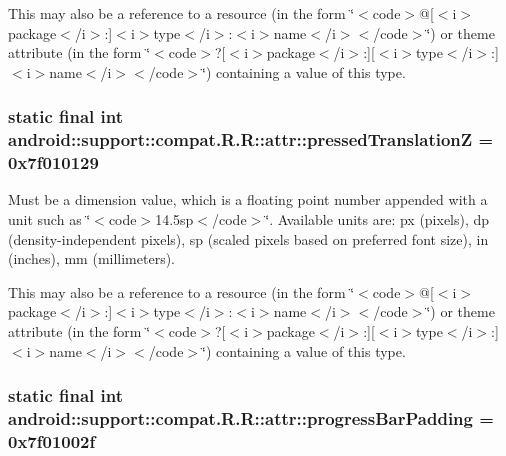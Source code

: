 This may also be a reference to a resource (in the form \char`\"{}$<$code$>$@\mbox{[}$<$i$>$package$<$/i$>$:\mbox{]}$<$i$>$type$<$/i$>$:$<$i$>$name$<$/i$>$$<$/code$>$\char`\"{}) or theme attribute (in the form \char`\"{}$<$code$>$?\mbox{[}$<$i$>$package$<$/i$>$:\mbox{]}\mbox{[}$<$i$>$type$<$/i$>$:\mbox{]}$<$i$>$name$<$/i$>$$<$/code$>$\char`\"{}) containing a value of this type. \hypertarget{classandroid_1_1support_1_1compat_1_1_r_1_1attr_0517f3b070d004ba4bca93d45eeea1df}{
\subsubsection[{pressedTranslationZ}]{\setlength{\rightskip}{0pt plus 5cm}static final int android::support::compat.R.R::attr::pressedTranslationZ = 0x7f010129}}
\label{classandroid_1_1support_1_1compat_1_1_r_1_1attr_0517f3b070d004ba4bca93d45eeea1df}


Must be a dimension value, which is a floating point number appended with a unit such as \char`\"{}$<$code$>$14.5sp$<$/code$>$\char`\"{}. Available units are: px (pixels), dp (density-independent pixels), sp (scaled pixels based on preferred font size), in (inches), mm (millimeters). 

This may also be a reference to a resource (in the form \char`\"{}$<$code$>$@\mbox{[}$<$i$>$package$<$/i$>$:\mbox{]}$<$i$>$type$<$/i$>$:$<$i$>$name$<$/i$>$$<$/code$>$\char`\"{}) or theme attribute (in the form \char`\"{}$<$code$>$?\mbox{[}$<$i$>$package$<$/i$>$:\mbox{]}\mbox{[}$<$i$>$type$<$/i$>$:\mbox{]}$<$i$>$name$<$/i$>$$<$/code$>$\char`\"{}) containing a value of this type. \hypertarget{classandroid_1_1support_1_1compat_1_1_r_1_1attr_790fb6152ffdb64cc651dc32c181a30e}{
\subsubsection[{progressBarPadding}]{\setlength{\rightskip}{0pt plus 5cm}static final int android::support::compat.R.R::attr::progressBarPadding = 0x7f01002f}}
\label{classandroid_1_1support_1_1compat_1_1_r_1_1attr_790fb6152ffdb64cc651dc32c181a30e}


